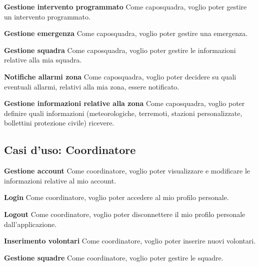 \textbf{Gestione intervento programmato}
Come caposquadra, voglio poter gestire un intervento programmato.

\textbf{Gestione emergenza}
Come caposquadra, voglio poter gestire una emergenza.

\textbf{Gestione squadra}
Come caposquadra, voglio poter gestire le informazioni relative alla mia squadra.

\textbf{Notifiche allarmi zona}
Come caposquadra, voglio poter decidere su quali eventuali allarmi, relativi alla mia zona, essere notificato.

\textbf{Gestione informazioni relative alla zona}
Come caposquadra, voglio poter definire quali informazioni (meteorologiche, terremoti, stazioni personalizzate, bollettini protezione civile) ricevere.


\subsection{Casi d'uso: Coordinatore}

\textbf{Gestione account}
Come coordinatore, voglio poter visualizzare e modificare le informazioni relative al mio account.

\textbf{Login}
Come coordinatore, voglio poter accedere al mio profilo personale.

\textbf{Logout}
Come coordinatore, voglio poter disconnettere il mio profilo personale dall'applicazione.

\textbf{Inserimento volontari}
Come coordinatore, voglio poter inserire nuovi volontari.

\textbf{Gestione squadre}
Come coordinatore, voglio poter gestire le squadre.



